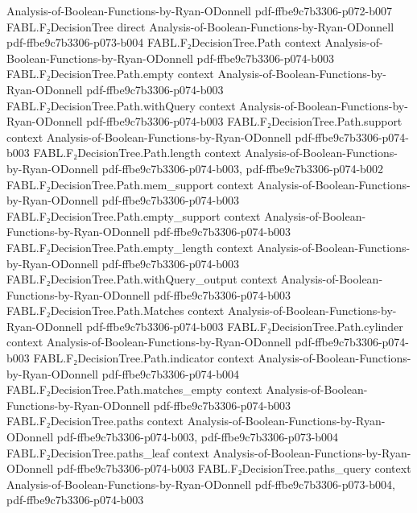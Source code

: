 \begin{theorem}
  {Analysis-of-Boolean-Functions-by-Ryan-ODonnell}
  {pdf-ffbe9c7b3306-p072-b007}
\proofstep
  {FABL.F₂DecisionTree}
  {direct}
  {Analysis-of-Boolean-Functions-by-Ryan-ODonnell}
  {pdf-ffbe9c7b3306-p073-b004}
\proofstep
  {FABL.F₂DecisionTree.Path}
  {context}
  {Analysis-of-Boolean-Functions-by-Ryan-ODonnell}
  {pdf-ffbe9c7b3306-p074-b003}
\proofstep
  {FABL.F₂DecisionTree.Path.empty}
  {context}
  {Analysis-of-Boolean-Functions-by-Ryan-ODonnell}
  {pdf-ffbe9c7b3306-p074-b003}
\proofstep
  {FABL.F₂DecisionTree.Path.withQuery}
  {context}
  {Analysis-of-Boolean-Functions-by-Ryan-ODonnell}
  {pdf-ffbe9c7b3306-p074-b003}
\proofstep
  {FABL.F₂DecisionTree.Path.support}
  {context}
  {Analysis-of-Boolean-Functions-by-Ryan-ODonnell}
  {pdf-ffbe9c7b3306-p074-b003}
\proofstep
  {FABL.F₂DecisionTree.Path.length}
  {context}
  {Analysis-of-Boolean-Functions-by-Ryan-ODonnell}
  {pdf-ffbe9c7b3306-p074-b003,
    pdf-ffbe9c7b3306-p074-b002}
\proofstep
  {FABL.F₂DecisionTree.Path.mem_support}
  {context}
  {Analysis-of-Boolean-Functions-by-Ryan-ODonnell}
  {pdf-ffbe9c7b3306-p074-b003}
\proofstep
  {FABL.F₂DecisionTree.Path.empty_support}
  {context}
  {Analysis-of-Boolean-Functions-by-Ryan-ODonnell}
  {pdf-ffbe9c7b3306-p074-b003}
\proofstep
  {FABL.F₂DecisionTree.Path.empty_length}
  {context}
  {Analysis-of-Boolean-Functions-by-Ryan-ODonnell}
  {pdf-ffbe9c7b3306-p074-b003}
\proofstep
  {FABL.F₂DecisionTree.Path.withQuery_output}
  {context}
  {Analysis-of-Boolean-Functions-by-Ryan-ODonnell}
  {pdf-ffbe9c7b3306-p074-b003}
\proofstep
  {FABL.F₂DecisionTree.Path.Matches}
  {context}
  {Analysis-of-Boolean-Functions-by-Ryan-ODonnell}
  {pdf-ffbe9c7b3306-p074-b003}
\proofstep
  {FABL.F₂DecisionTree.Path.cylinder}
  {context}
  {Analysis-of-Boolean-Functions-by-Ryan-ODonnell}
  {pdf-ffbe9c7b3306-p074-b003}
\proofstep
  {FABL.F₂DecisionTree.Path.indicator}
  {context}
  {Analysis-of-Boolean-Functions-by-Ryan-ODonnell}
  {pdf-ffbe9c7b3306-p074-b004}
\proofstep
  {FABL.F₂DecisionTree.Path.matches_empty}
  {context}
  {Analysis-of-Boolean-Functions-by-Ryan-ODonnell}
  {pdf-ffbe9c7b3306-p074-b003}
\proofstep
  {FABL.F₂DecisionTree.paths}
  {context}
  {Analysis-of-Boolean-Functions-by-Ryan-ODonnell}
  {pdf-ffbe9c7b3306-p074-b003,
    pdf-ffbe9c7b3306-p073-b004}
\proofstep
  {FABL.F₂DecisionTree.paths_leaf}
  {context}
  {Analysis-of-Boolean-Functions-by-Ryan-ODonnell}
  {pdf-ffbe9c7b3306-p074-b003}
\proofstep
  {FABL.F₂DecisionTree.paths_query}
  {context}
  {Analysis-of-Boolean-Functions-by-Ryan-ODonnell}
  {pdf-ffbe9c7b3306-p073-b004,
    pdf-ffbe9c7b3306-p074-b003}
\proofstep

\end{theorem}
